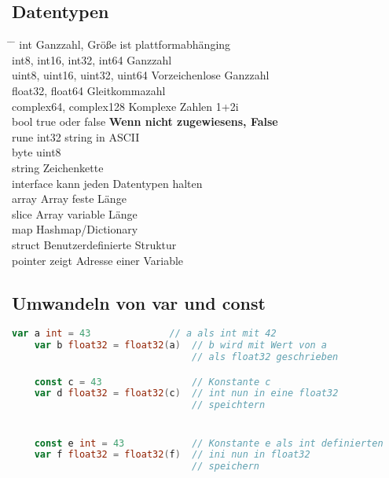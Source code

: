 \documentclass[twoside,a4paper,12pt]{article}
\begin{document}
\subsection{Datentypen}
\begin{tabbing}
 \hspace{2mm} \= \hspace{50mm} \= \kill
 \> int \> Ganzzahl, Größe ist plattformabhänging \\
 \> int8, int16, int32, int64 \> Ganzzahl \\
 \> uint8, uint16, uint32, uint64 \> Vorzeichenlose Ganzzahl \\
 \> float32, float64 \> Gleitkommazahl \\ 
 \> complex64, complex128 \> Komplexe Zahlen 1+2i \\
 \> bool \> true oder false \textbf{Wenn nicht zugewiesens, False} \\ 
 \> rune \> int32 string in ASCII\\ 
 \> byte \> uint8 \\
 \> string \> Zeichenkette \\ 
 \> interface{} \> kann jeden Datentypen halten \\
 \> array \> Array feste Länge \\ 
 \> slice \> Array variable Länge \\ 
 \> map \> Hashmap/Dictionary \\ 
 \> struct \> Benutzerdefinierte Struktur \\ 
 \> pointer \> zeigt Adresse einer Variable \\
 \end{tabbing}
\subsection{Umwandeln von var und const}
\begin{center}
  \begin{minipage}{1.0\textwidth}
    \begin{lstlisting}[language=Go]
    var a int = 43              // a als int mit 42
    var b float32 = float32(a)  // b wird mit Wert von a
                                // als float32 geschrieben

    const c = 43                // Konstante c
    var d float32 = float32(c)  // int nun in eine float32
                                // speichtern


    const e int = 43            // Konstante e als int definierten
    var f float32 = float32(f)  // ini nun in float32 
                                // speichern
    \end{lstlisting}
  \end{minipage}
\end{center}  
\end{document}
